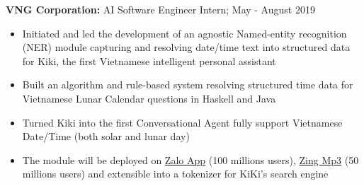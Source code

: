 \documentclass[a4paper,11pt]{article}
\begin{document}
\begin{flushleft}
	\textbf{VNG Corporation: } AI Software Engineer Intern; May - August 2019 \\
	\vspace{-\topsep}
	\begin{itemize}
		\setlength{\parskip}{0pt}
		\setlength{\itemsep}{0pt plus 1pt}
		\item Initiated and led the development of an agnostic Named-entity recognition (NER) module capturing and resolving date/time text into structured data for Kiki, the first Vietnamese intelligent personal assistant
		\item Built an algorithm and rule-based system resolving structured time data for Vietnamese Lunar Calendar questions in Haskell and Java  
		\item Turned Kiki into the first Conversational Agent fully support Vietnamese Date/Time (both solar and lunar day) 
		\item  The module will be deployed on  \href{https://oa.zalo.me/home}{Zalo App} (100 millions users),  \href{https://mp3.zing.vn/}{Zing Mp3} (50 millions users) and extensible into a tokenizer for KiKi's search engine
	\end{itemize}
\vspace{-\topsep}
\centering{\noindent\makebox{\rule{8cm}{1.5pt}}}
\end{flushleft} 
\end{document}
